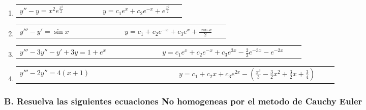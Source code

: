 \documentclass[a4paper,12pt]{article}
\begin{document}
\begin{enumerate}
    \item
    \begin{tabularx}{\linewidth}{L{0.45\linewidth} R{0.45\linewidth}}
    \( y'' - y = x^2 e^{\frac{x^2}{2}} \) & \(\displaystyle y = c_1 e^x + c_2 e^{-x} + e^{\frac{x^2}{2}} \)
    \end{tabularx}

    \item
    \begin{tabularx}{\linewidth}{L{0.45\linewidth} R{0.45\linewidth}}
    \( y''' - y' = \sin x \) & \(\displaystyle y = c_1 + c_2 e^{-x} + c_3 e^{x} + \frac{\cos x}{2} \)
    \end{tabularx}

    \item
    \begin{tabularx}{\linewidth}{L{0.45\linewidth} R{0.45\linewidth}}
    \( y''' - 3 y'' - y' + 3 y = 1 + e^x \) & \(\displaystyle y = c_1 e^x + c_2 e^{-x} + c_3 e^{3x} - \frac{2}{3} e^{-3x} - e^{-2x} \)
    \end{tabularx}

    \item
    \begin{tabularx}{\linewidth}{L{0.45\linewidth} R{0.45\linewidth}}
    \( y''' - 2 y'' = 4 (x + 1) \) & \(\displaystyle y = c_1 + c_2 x + c_3 e^{2x} - \left( \frac{x^3}{3} - \frac{3}{2} x^2 + \frac{3}{2} x + \frac{3}{4} \right) \)
    \end{tabularx}
\end{enumerate}


\subsubsection*{B. Resuelva las siguientes ecuaciones No homogeneas por el metodo de Cauchy Euler}
\end{document}
